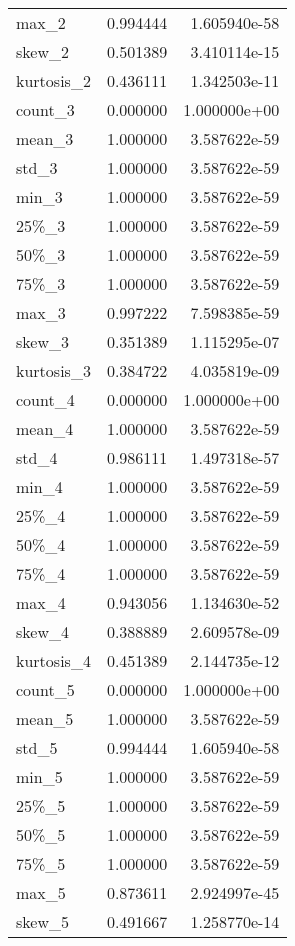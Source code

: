 \begin{longtable}{lrr}
max\_2      &  0.994444 &  1.605940e-58 \\
skew\_2     &  0.501389 &  3.410114e-15 \\
kurtosis\_2 &  0.436111 &  1.342503e-11 \\
count\_3    &  0.000000 &  1.000000e+00 \\
mean\_3     &  1.000000 &  3.587622e-59 \\
std\_3      &  1.000000 &  3.587622e-59 \\
min\_3      &  1.000000 &  3.587622e-59 \\
25\%\_3      &  1.000000 &  3.587622e-59 \\
50\%\_3      &  1.000000 &  3.587622e-59 \\
75\%\_3      &  1.000000 &  3.587622e-59 \\
max\_3      &  0.997222 &  7.598385e-59 \\
skew\_3     &  0.351389 &  1.115295e-07 \\
kurtosis\_3 &  0.384722 &  4.035819e-09 \\
count\_4    &  0.000000 &  1.000000e+00 \\
mean\_4     &  1.000000 &  3.587622e-59 \\
std\_4      &  0.986111 &  1.497318e-57 \\
min\_4      &  1.000000 &  3.587622e-59 \\
25\%\_4      &  1.000000 &  3.587622e-59 \\
50\%\_4      &  1.000000 &  3.587622e-59 \\
75\%\_4      &  1.000000 &  3.587622e-59 \\
max\_4      &  0.943056 &  1.134630e-52 \\
skew\_4     &  0.388889 &  2.609578e-09 \\
kurtosis\_4 &  0.451389 &  2.144735e-12 \\
count\_5    &  0.000000 &  1.000000e+00 \\
mean\_5     &  1.000000 &  3.587622e-59 \\
std\_5      &  0.994444 &  1.605940e-58 \\
min\_5      &  1.000000 &  3.587622e-59 \\
25\%\_5      &  1.000000 &  3.587622e-59 \\
50\%\_5      &  1.000000 &  3.587622e-59 \\
75\%\_5      &  1.000000 &  3.587622e-59 \\
max\_5      &  0.873611 &  2.924997e-45 \\
skew\_5     &  0.491667 &  1.258770e-14 \\

\end{longtable}
